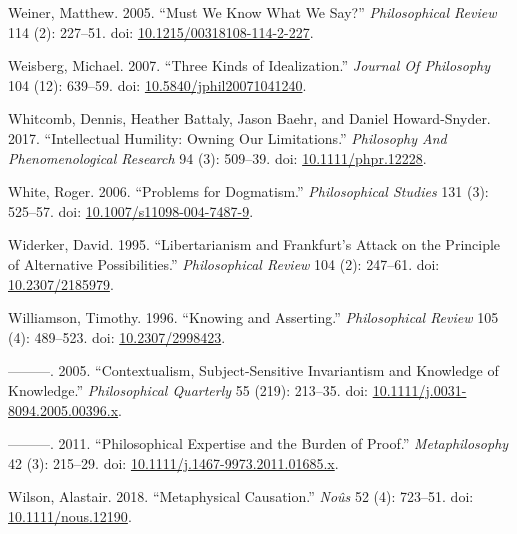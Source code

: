\documentclass[
  10pt,
  letterpaper,
  DIV=11,
  numbers=noendperiod,
  twoside]{scrartcl}
\newlength{\cslhangindent}
\newenvironment{CSLReferences}[2] %
 {\begin{list}{}{%
  \setlength{\itemindent}{0pt}
  \setlength{\leftmargin}{0pt}
  \setlength{\parsep}{0pt}
  \ifodd #1
   \setlength{\leftmargin}{\cslhangindent}
   \setlength{\itemindent}{-1\cslhangindent}
  \fi
  \setlength{\itemsep}{#2\baselineskip}}}
 {\end{list}}
\begin{document}
\begin{CSLReferences}{1}{0}
Weiner, Matthew. 2005. {``Must We Know What We Say?''}
\emph{Philosophical Review} 114 (2): 227--51. doi:
\href{https://doi.org/10.1215/00318108-114-2-227}{10.1215/00318108-114-2-227}.

Weisberg, Michael. 2007. {``Three Kinds of Idealization.''}
\emph{Journal Of Philosophy} 104 (12): 639--59. doi:
\href{https://doi.org/10.5840/jphil20071041240}{10.5840/jphil20071041240}.

Whitcomb, Dennis, Heather Battaly, Jason Baehr, and Daniel
Howard-Snyder. 2017. {``Intellectual Humility: Owning Our
Limitations.''} \emph{Philosophy And Phenomenological Research} 94 (3):
509--39. doi:
\href{https://doi.org/10.1111/phpr.12228}{10.1111/phpr.12228}.

White, Roger. 2006. {``Problems for Dogmatism.''} \emph{Philosophical
Studies} 131 (3): 525--57. doi:
\href{https://doi.org/10.1007/s11098-004-7487-9}{10.1007/s11098-004-7487-9}.

Widerker, David. 1995. {``Libertarianism and Frankfurt's Attack on the
Principle of Alternative Possibilities.''} \emph{Philosophical Review}
104 (2): 247--61. doi:
\href{https://doi.org/10.2307/2185979}{10.2307/2185979}.

Williamson, Timothy. 1996. {``Knowing and Asserting.''}
\emph{Philosophical Review} 105 (4): 489--523. doi:
\href{https://doi.org/10.2307/2998423}{10.2307/2998423}.

---------. 2005. {``Contextualism, Subject-Sensitive Invariantism and
Knowledge of Knowledge.''} \emph{Philosophical Quarterly} 55 (219):
213--35. doi:
\href{https://doi.org/10.1111/j.0031-8094.2005.00396.x}{10.1111/j.0031-8094.2005.00396.x}.

---------. 2011. {``Philosophical Expertise and the Burden of Proof.''}
\emph{Metaphilosophy} 42 (3): 215--29. doi:
\href{https://doi.org/10.1111/j.1467-9973.2011.01685.x}{10.1111/j.1467-9973.2011.01685.x}.

Wilson, Alastair. 2018. {``Metaphysical Causation.''} \emph{Noûs} 52
(4): 723--51. doi:
\href{https://doi.org/10.1111/nous.12190}{10.1111/nous.12190}.


\end{CSLReferences}
\end{document}
